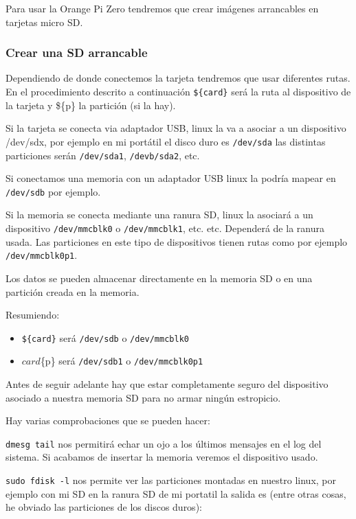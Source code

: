 \documentclass[12pt,spanish,]{scrartcl}
\providecommand{\tightlist}{%
  \setlength{\itemsep}{0pt}\setlength{\parskip}{0pt}}
\begin{document}
Para usar la Orange Pi Zero tendremos que crear imágenes arrancables en
tarjetas micro SD.

\hypertarget{crear-una-sd-arrancable}{%
\subsubsection{Crear una SD arrancable}\label{crear-una-sd-arrancable}}

Dependiendo de donde conectemos la tarjeta tendremos que usar diferentes
rutas. En el procedimiento descrito a continuación \texttt{\$\{card\}}
será la ruta al dispositivo de la tarjeta y \$\{p\} la partición (si la
hay).

Si la tarjeta se conecta via adaptador USB, linux la va a asociar a un
dispositivo /dev/sdx, por ejemplo en mi portátil el disco duro es
\texttt{/dev/sda} las distintas particiones serán \texttt{/dev/sda1},
\texttt{/devb/sda2}, etc.

Si conectamos una memoria con un adaptador USB linux la podría mapear en
\texttt{/dev/sdb} por ejemplo.

Si la memoria se conecta mediante una ranura SD, linux la asociará a un
dispositivo \texttt{/dev/mmcblk0} o \texttt{/dev/mmcblk1}, etc. etc.
Dependerá de la ranura usada. Las particiones en este tipo de
dispositivos tienen rutas como por ejemplo \texttt{/dev/mmcblk0p1}.

Los datos se pueden almacenar directamente en la memoria SD o en una
partición creada en la memoria.

Resumiendo:

\begin{itemize}
\tightlist
\item
  \texttt{\$\{card\}} será \texttt{/dev/sdb} o \texttt{/dev/mmcblk0}
\item
  \({card}\)\{p\} será \texttt{/dev/sdb1} o \texttt{/dev/mmcblk0p1}
\end{itemize}

Antes de seguir adelante hay que estar completamente seguro del
dispositivo asociado a nuestra memoria SD para no armar ningún
estropicio.

Hay varias comprobaciones que se pueden hacer:

\texttt{dmesg\ \textbar{}tail} nos permitirá echar un ojo a los últimos
mensajes en el log del sistema. Si acabamos de insertar la memoria
veremos el dispositivo usado.

\texttt{sudo\ fdisk\ -l} nos permite ver las particiones montadas en
nuestro linux, por ejemplo con mi SD en la ranura SD de mi portatil la
salida es (entre otras cosas, he obviado las particiones de los discos
duros):
\end{document}
